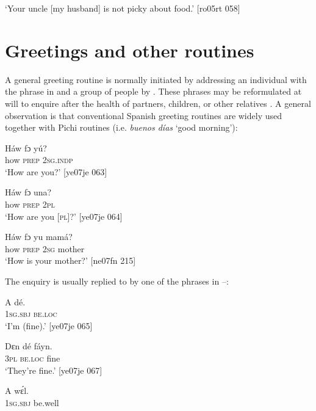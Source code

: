 \glt ‘Your uncle [my husband] is not picky about food.’ [ro05rt 058]
\z

\section{Greetings and other routines}\label{sec:12.4}

A general greeting routine is normally initiated by addressing an individual with the phrase in  and a group of people by . These phrases may be reformulated at will to enquire after the health of partners, children, or other relatives . A general observation is that conventional Spanish greeting routines are widely used together with Pichi routines (i.e. \textit{buenos días} ‘good morning’):


\ea%
    \label{ex:key:1682}
    \gll Háw    fɔ  yú?\\
how    \textsc{prep}  \textsc{2sg.indp}\\

\glt ‘How are you?’ [ye07je 063]
\z


\ea%
    \label{ex:key:1683}
    \gll Háw    fɔ  una?\\
how    \textsc{prep}  \textsc{2pl}\\

\glt ‘How are you [\textsc{pl}]?’ [ye07je 064]
\z


\ea%
    \label{ex:key:1684}
    \gll Háw    fɔ  yu  mamá?\\
how    \textsc{prep}  \textsc{2sg}  mother\\

\glt ‘How is your mother?’ [ne07fn 215]
\z

The enquiry is usually replied to by one of the phrases in –:


\ea%
    \label{ex:key:1685}
    \gll A    dé.\\
\textsc{1sg.sbj}  \textsc{be.loc}\\

\glt ‘I’m (fine).’ [ye07je 065]
\z


\ea%
    \label{ex:key:1686}
    \gll Dɛn  dé    fáyn.\\
\textsc{3pl}  \textsc{be.loc}  fine\\

\glt ‘They’re fine.’ [ye07je 067]
\z


\ea%
    \label{ex:key:1687}
    \gll A    wɛ́l.\\
\textsc{1sg.sbj}  be.well\\

